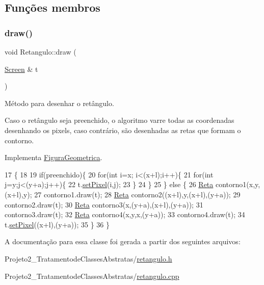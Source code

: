 \subsection{Funções membros}
\mbox{\label{class_retangulo_ac088dd6d3f4f3d3f80363a868c2e74f1}} 
\subsubsection{\texorpdfstring{draw()}{draw()}}
{\footnotesize\ttfamily void Retangulo\+::draw (\begin{DoxyParamCaption}\item[{\mbox{\hyperlink{class_screen}{Screen}} \&}]{t }\end{DoxyParamCaption})\hspace{0.3cm}{\ttfamily [virtual]}}



Método para desenhar o retângulo. 

Caso o retângulo seja preenchido, o algoritmo varre todas as coordenadas desenhando os pixels, caso contrário, são desenhadas as retas que formam o contorno. 

Implementa \mbox{\hyperlink{class_figura_geometrica_a8ee8dedc060b6059a805ea091aef2c41}{Figura\+Geometrica}}.


\begin{DoxyCode}
17                              \{
18 
19     \textcolor{keywordflow}{if}(preenchido)\{
20         \textcolor{keywordflow}{for}(\textcolor{keywordtype}{int} i=x; i<(x+l);i++)\{
21             \textcolor{keywordflow}{for}(\textcolor{keywordtype}{int} j=y;j<(y+a);j++)\{
22                 t.\mbox{\hyperlink{class_screen_ae6bea81c57a22d226507c3c26fa95ee0}{setPixel}}(i,j);
23             \}
24         \}
25     \} \textcolor{keywordflow}{else} \{
26         \mbox{\hyperlink{class_reta}{Reta}} contorno1(x,y,(x+l),y);
27         contorno1.draw(t);
28         \mbox{\hyperlink{class_reta}{Reta}} contorno2((x+l),y,(x+l),(y+a));
29         contorno2.draw(t);
30         \mbox{\hyperlink{class_reta}{Reta}} contorno3(x,(y+a),(x+l),(y+a));
31         contorno3.draw(t);
32         \mbox{\hyperlink{class_reta}{Reta}} contorno4(x,y,x,(y+a));
33         contorno4.draw(t);
34         t.\mbox{\hyperlink{class_screen_ae6bea81c57a22d226507c3c26fa95ee0}{setPixel}}((x+l),(y+a));
35     \}
36 \}
\end{DoxyCode}


A documentação para essa classe foi gerada a partir dos seguintes arquivos\+:\begin{DoxyCompactItemize}
\item 
Projeto2\+\_\+\+Tratamentode\+Classes\+Abstratas/\mbox{\hyperlink{retangulo_8h}{retangulo.\+h}}\item 
Projeto2\+\_\+\+Tratamentode\+Classes\+Abstratas/\mbox{\hyperlink{retangulo_8cpp}{retangulo.\+cpp}}\end{DoxyCompactItemize}
